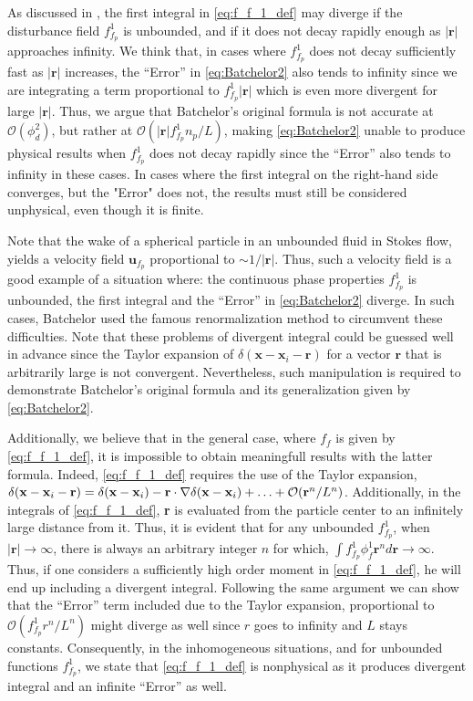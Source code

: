 As discussed in \citet{batchelor1972sedimentation}, the first integral in \ref{eq:f_f_1_def} may diverge if the disturbance field $f_{f_p}^1$ is unbounded, and if it does not decay rapidly enough as $|\textbf{r}|$ approaches infinity. 
We think that, in cases where $f_{f_p}^1$ does not decay sufficiently fast as $|\textbf{r}|$ increases, the ``Error'' in \ref{eq:Batchelor2} also tends to infinity since we are integrating a term proportional to $f_{f_p}^1 |\textbf{r}|$ which is even more divergent for large $|\textbf{r}|$. 
Thus, we argue that Batchelor's original formula is not accurate at $\mathcal{O}(\phi_d^2)$, but rather at $\mathcal{O}(|\textbf{r}| f_{f_p}^1  n_p / L)$, making \ref{eq:Batchelor2} unable to produce physical results when $f_{f_p}^1$ does not decay rapidly since the ``Error'' also tends to infinity in these cases. 
In cases where the first integral on the right-hand side converges, but the "Error" does not, the results must still be considered unphysical, even though it is finite. 

Note that the wake of a spherical particle in an unbounded fluid in Stokes flow, yields a velocity field $\textbf{u}_{f_p}$ proportional to  $\sim 1/|\textbf{r}|$. 
Thus, such a velocity field is a good example of a situation where: the continuous phase properties $f_{f_p}^1$ is unbounded, the first integral and the ``Error'' in \ref{eq:Batchelor2} diverge. 
In such cases, Batchelor used the famous renormalization method to circumvent these difficulties. 
Note that these problems of divergent integral could be guessed well in advance since the Taylor expansion of $\delta(\textbf{x} - \textbf{x}_i - \textbf{r})$ for a vector $\textbf{r}$ that is arbitrarily large is not convergent. 
Nevertheless, such manipulation is required to demonstrate Batchelor's original formula and its generalization given by \eqref{eq:Batchelor2}. 


Additionally, we believe that in the general case, where $f_f$ is given by \ref{eq:f_f_1_def}, it is impossible to obtain meaningfull results with the latter formula. 
Indeed, \ref{eq:f_f_1_def} requires the use of the Taylor expansion, $\delta(\textbf{x} - \textbf{x}_i - \textbf{r}) =\delta(\textbf{x} - \textbf{x}_i) - \textbf{r}\cdot \mathbf{\nabla}\delta(\textbf{x} - \textbf{x}_i)+ \ldots + \mathcal{O}(\textbf{r}^n/L^n)$. 
Additionally, in the integrals of \ref{eq:f_f_1_def}, \textbf{r} is evaluated from the particle center to an infinitely large distance from it.
Thus, it is evident that for any unbounded $f_{f_p}^1$, when $|\textbf{r}| \to \infty$, there is always an arbitrary integer $n$ for which, $\int f_{f_p}^1 \phi^1_f \textbf{r}^n d\textbf{r} \to \infty$.
Thus, if one considers a sufficiently high order moment in \ref{eq:f_f_1_def}, he will end up including a divergent integral. 
Following the same argument we can show that the  ``Error'' term included due to the Taylor expansion, proportional to $\mathcal{O}(f_{f_p}^1 r^n /L^n)$ might diverge as well since $r$ goes to infinity and $L$ stays constants. 
Consequently, in the inhomogeneous situations, and for unbounded functions $f_{f_p}^1$, we state that \ref{eq:f_f_1_def} is nonphysical as it produces divergent integral and an infinite ``Error'' as well. 
 
